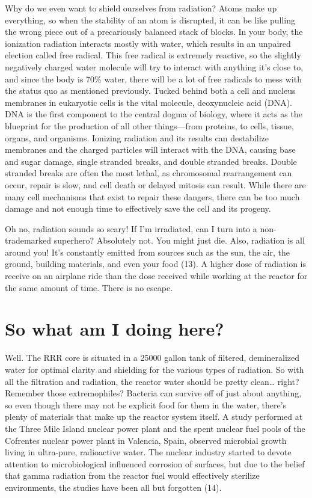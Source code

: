\documentclass[12pt,twoside]{reedthesis}
\begin{document}
Why do we even want to shield ourselves from radiation? Atoms make up everything, so when the stability of an atom is disrupted, it can be like pulling the wrong piece out of a precariously balanced stack of blocks. In your body, the ionization radiation interacts mostly with water, which results in an unpaired election called free radical. This free radical is extremely reactive, so the slightly negatively charged water molecule will try to interact with anything it's close to, and since the body is 70\% water, there will be a lot of free radicals to mess with the status quo as mentioned previously. Tucked behind both a cell and nucleus membranes in eukaryotic cells is the vital molecule, deoxynucleic acid (DNA). DNA is the first component to the central dogma of biology, where it acts as the blueprint for the production of all other things---from proteins, to cells, tissue, organs, and organisms. Ionizing radiation and its results can destabilize membranes and the charged particles will interact with the DNA, causing base and sugar damage, single stranded breaks, and double stranded breaks. Double stranded breaks are often the most lethal, as chromosomal rearrangement can occur, repair is slow, and cell death or delayed mitosis can result. While there are many cell mechanisms that exist to repair these dangers, there can be too much damage and not enough time to effectively save the cell and its progeny.

Oh no, radiation sounds so scary! If I'm irradiated, can I turn into a non-trademarked superhero? Absolutely not. You might just die. Also, radiation is all around you! It's constantly emitted from sources such as the sun, the air, the ground, building materials, and even your food (13). A higher dose of radiation is receive on an airplane ride than the dose received while working at the reactor for the same amount of time. There is no escape.

\hypertarget{so-what-am-i-doing-here}{%
\section{So what am I doing here?}\label{so-what-am-i-doing-here}}

Well. The RRR core is situated in a 25000 gallon tank of filtered, demineralized water for optimal clarity and shielding for the various types of radiation. So with all the filtration and radiation, the reactor water should be pretty clean\ldots{} right?
Remember those extremophiles? Bacteria can survive off of just about anything, so even though there may not be explicit food for them in the water, there's plenty of materials that make up the reactor system itself. A study performed at the Three Mile Island nuclear power plant and the spent nuclear fuel pools of the Cofrentes nuclear power plant in Valencia, Spain, observed microbial growth living in ultra-pure, radioactive water. The nuclear industry started to devote attention to microbiological influenced corrosion of surfaces, but due to the belief that gamma radiation from the reactor fuel would effectively sterilize environments, the studies have been all but forgotten (14).
\end{document}
